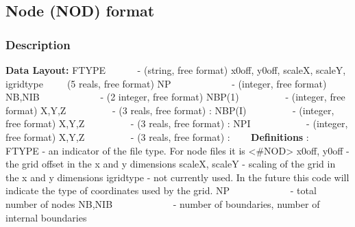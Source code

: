 \documentclass{article}
\begin{document}
\newpage
\subsection[Node (NOD) format]{Node (NOD) format}

\subsubsection[Description]{Description}
\textbf{Data Layout:}\newline
FTYPE \ \ \ \ \ \  {}- (string, free format) \newline
x0off, y0off, scaleX, scaleY, igridtype\ \ \ \ \ (5 reals, free format)\newline
NP \ \ \ \ \ \ \ \ \ \ \ \ {}- (integer, free format)\newline
NB,NIB \ \ \ \ \ \ \ \ \ \ \ \ {}- (2 integer, free format)\newline
NBP(1) \ \ \ \ \ \ \ \ \ {}- (integer, free format)\newline
X,Y,Z \ \ \ \ \ \ \ \ \ {}- (3 reals, free format)\newline
:\newline
NBP(I) \ \ \ \ \ \ \ \ \ {}- (integer, free format)\newline
X,Y,Z \ \ \ \ \ \ \ \ \ {}- (3 reals, free format)\newline
:\newline
NPI \ \ \ \ \ \ \ \ \ \ \ {}- (integer, free format)\newline
X,Y,Z \ \ \ \ \ \ \ \ \ {}- (3 reals, free format)\newline
:\newline
 \ \ \ \newline
\textbf{Definitions} :\newline
 \ \newline
FTYPE - an indicator of the file type.  For node files it is <\#NOD> \newline
x0off, y0off - the grid offset in the x and y dimensions \newline
scaleX, scaleY - scaling of the grid in the x and y dimensions \newline
igridtype - not currently used.  In the future this code will indicate the type of coordinates used by the grid. \newline
NP \ \ \ \ \ \ \ \ \ \ \ \ {}- total number of nodes\newline
NB,NIB \ \ \ \ \ \ \ \ \ \ \ \ {}- number of boundaries, number of internal boundaries\newline
\end{document}

